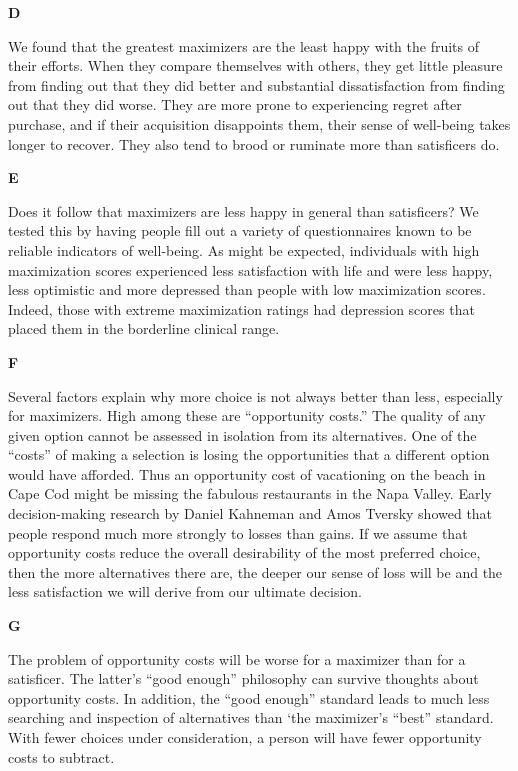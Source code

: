 \documentclass{../templateReading/cdreading}
\begin{document}
\textbf{D}\par

We found that the greatest maximizers are the least happy with the fruits of their efforts. When they compare themselves with others, they get little pleasure from finding out that they did better and substantial dissatisfaction from finding out that they did worse. They are more prone to experiencing regret after purchase, and if their acquisition disappoints them, their sense of well-being takes longer to recover. They also tend to brood or ruminate more than satisficers do.

\textbf{E}\par

Does it follow that maximizers are less happy in general than satisficers? We tested this by having people fill out a variety of questionnaires known to be reliable indicators of well-being. As might be expected, individuals with high maximization scores experienced less satisfaction with life and were less happy, less optimistic and more depressed than people with low maximization scores. Indeed, those with extreme maximization ratings had depression scores that placed them in the borderline clinical range.

\textbf{F}\par

Several factors explain why more choice is not always better than less, especially for maximizers. High among these are “opportunity costs.” The quality of any given option cannot be assessed in isolation from its alternatives. One of the “costs” of making a selection is losing the opportunities that a different option would have afforded. Thus an opportunity cost of vacationing on the beach in Cape Cod might be missing the fabulous restaurants in the Napa Valley. Early decision-making research by Daniel Kahneman and Amos Tversky showed that people respond much more strongly to losses than gains. If we assume that opportunity costs reduce the overall desirability of the most preferred choice, then the more alternatives there are, the deeper our sense of loss will be and the less satisfaction we will derive from our ultimate decision.

\textbf{G}\par

The problem of opportunity costs will be worse for a maximizer than for a satisficer. The latter’s “good enough” philosophy can survive thoughts about opportunity costs. In addition, the “good enough” standard leads to much less searching and inspection of alternatives than ‘the maximizer’s “best” standard. With fewer choices under consideration, a person will have fewer opportunity costs to subtract.
\end{document}
